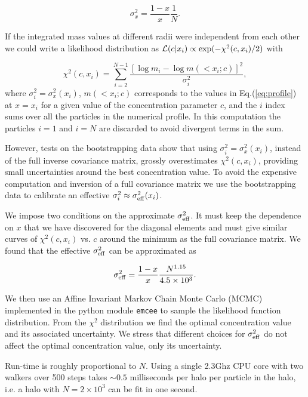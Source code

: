 \documentclass{emulateapj}
\begin{document}
\begin{equation}
\sigma_x^2 = \frac{1-x}{x}\frac{1}{N}.
\label{eq:sigma}
\end{equation}

If the integrated mass values at different radii were independent from
each other we could write a likelihood distribution as ${\cal
  L}(c|x_i)\propto \exp(-\chi^2(c,x_i)/2)$ with   

\begin{equation}
\chi^2(c,x_i)= \sum_{i=2}^{N-1}\frac{[\log m_i - \log m(< x_i;c)]^2}{\sigma_i^2},
\end{equation}
%
where $\sigma_i^2=\sigma_x^2(x_i)$, $m(<x_i;c)$ corresponds to the
values in Eq.(\ref{eq:profile}) at $x=x_i$ for a given value of the
concentration parameter $c$, and the $i$ index sums over all the
particles in the numerical profile. 
In this computation the particles $i=1$ and $i=N$ are discarded to
avoid divergent terms in the sum.

However, tests on the bootstrapping data show that using
$\sigma_i^2=\sigma_x^2(x_i)$, instead of the full inverse covariance
matrix, grossly overestimates $\chi^2(c,x_i)$,
providing small uncertainties around the best concentration value. 
To avoid the expensive computation and inversion of a full covariance
matrix we use the bootstrapping data to calibrate an effective
$\sigma_i^2\approx \sigma_{\rm eff}^2(x_i)$.

We impose two conditions on the approximate $\sigma_{\rm eff}^{2}$. It
must keep the dependence on $x$ that we have discovered for the
diagonal elements and must give similar curves of $\chi^{2}(c,x_i)$
vs. $c$ around the minimum as the full covariance matrix.
We found that the effective $\sigma_{\rm eff}^2$ can be approximated
as 

\begin{equation}
\sigma_{\rm eff}^2 = \frac{1-x}{x}\frac{N^{1.15}}{4.5\times 10^3}.
\end{equation}

We then use an Affine Invariant Markov Chain Monte Carlo (MCMC)
implemented in the python module {\texttt{emcee}} \citep{emcee} to sample the
likelihood function distribution.
From the $\chi^2$ distribution we find the optimal concentration value
and its associated uncertainty.   
We stress that different choices for $\sigma^2_{\rm eff}$ do not
affect the optimal concentration value, only its uncertainty.

Run-time is roughly proportional to $N$. Using a single 2.3Ghz CPU core with two
walkers over 500 steps takes $\sim 0.5$ milliseconds per halo per
particle in the halo, i.e. a halo with $N=2\times 10^{3}$ can be fit
in one second. 
\end{document}
